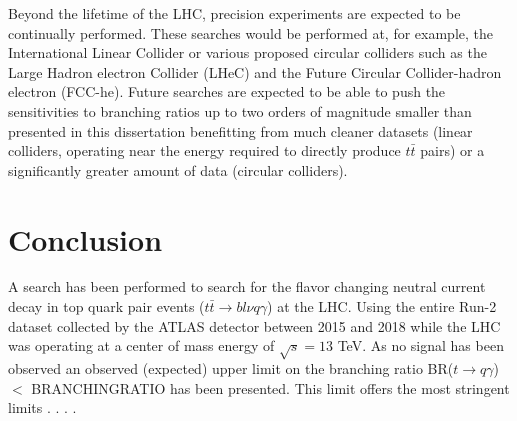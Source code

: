 Beyond the lifetime of the LHC, precision experiments are expected to be continually performed.  These searches would be performed at, for example, the International Linear Collider \cite{Buesser:2013pza} or various proposed circular colliders such as the Large Hadron electron Collider (LHeC) and the Future Circular Collider-hadron electron (FCC-he)\cite{Benedikt:2015kqj}.  Future searches are expected to be able to push the sensitivities to branching ratios up to two orders of magnitude smaller than presented in this dissertation\cite{Cakir:2018ruj} benefitting from much cleaner datasets (linear colliders, operating near the energy required to directly produce $t\bar{t}$ pairs) or a significantly greater amount of data (circular colliders).

\section{Conclusion}

A search has been performed to search for the flavor changing neutral current decay in top quark pair events ($t\bar{t}\rightarrow bl\nu q \gamma$) at the LHC.  Using the entire Run-2 dataset collected by the ATLAS detector between 2015 and 2018 while the LHC was operating at a center of mass energy of $\sqrt{s}=13$ TeV.  As no signal has been observed an observed (expected) upper limit on the branching ratio BR($t\rightarrow q \gamma$) $<$ BRANCHINGRATIO has been presented.  This limit offers the most stringent limits . . . .%

